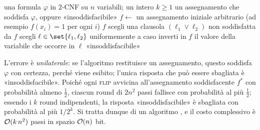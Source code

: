 \begin{algorithm}[H]
\caption{Algoritmo randomizzato per 2-SAT}
\begin{algorithmic}[1]
\Require una formula $\varphi$ in 2-CNF su $n$ variabili; un intero $k \ge 1$
\Ensure un assegnamento che soddisfa $\varphi$, oppure «insoddisfacibile»
  \State $f \gets$ un assegnamento iniziale arbitrario (ad esempio $f(x_i)=1$ per ogni $i$)
      \State \Return $f$
    \EndIf
    \State scegli una clausola $(\ell_1\vee\ell_2)$ non soddisfatta da $f$
    \State scegli $\ell \in \set{\ell_1,\ell_2}$ uniformemente a caso
    \State inverti in $f$ il valore della variabile che occorre in $\ell$
  \EndFor
\EndFor
\State \Return «insoddisfacibile»
\end{algorithmic}
\end{algorithm}

\begin{osservazione}
L'errore è \emph{unilaterale}: se l'algoritmo restituisce un assegnamento, questo soddisfa
$\varphi$ con certezza, perché viene esibito; l'unica risposta che può essere sbagliata è
«insoddisfacibile». Poiché ogni \textsc{flip} avvicina all'assegnamento soddisfacente $f^{*}$
con probabilità almeno $\tfrac12$, ciascun round di $2n^{2}$ passi fallisce con probabilità al
più $\tfrac12$; essendo i $k$ round indipendenti, la risposta «insoddisfacibile» è sbagliata
con probabilità al più $1/2^{k}$. Si tratta dunque di un algoritmo \MonteCarlo, e il costo
complessivo è $\mathcal{O}(k\,n^{2})$ passi in spazio $\mathcal{O}(n)$ bit.
\end{osservazione}
